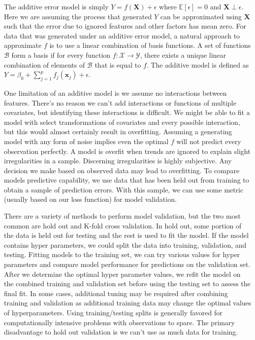 \documentclass[
  12pt,
  letterpaper,
  DIV=11,
  numbers=noendperiod]{scrartcl}
\newcommand{\bm}{\mathbf}
\begin{document}
The additive error model is simply \(Y=f(\bm X)+\epsilon\) where
\(\mathbb{E}[\epsilon]=0\) and \(\bm X\perp\epsilon\). Here we are
assuming the process that generated \(Y\) can be approximated using
\(\bm X\) such that the error due to ignored features and other factors
has mean zero. For data that was generated under an additive error
model, a natural approach to approximate \(f\) is to use a linear
combination of basis functions. A set of functions \(\mathcal{B}\) form
a basis if for every function \(f:\mathcal{X}\rightarrow\mathcal{Y}\),
there exists a unique linear combination of elements of \(\mathcal{B}\)
that is equal to \(f\). The additive model is defined as
\(Y=\beta_0+\sum_{j=1}^pf_j(\bm x_j)+\epsilon\).

One limitation of an additive model is we assume no interactions between
features. There's no reason we can't add interactions or functions of
multiple covariates, but identifying these interactions is difficult. We
might be able to fit a model with select transformations of covariates
and every possible interaction, but this would almost certainly result
in overfitting. Assuming a generating model with any form of noise
implies even the optimal \(f\) will not predict every observation
perfectly. A model is overfit when trends are ignored to explain slight
irregularities in a sample. Discerning irregularities is highly
subjective. Any decision we make based on observed data may lead to
overfitting. To compare models predictive capability, we use data that
has been held out from training to obtain a sample of prediction errors.
With this sample, we can use some metric (usually based on our loss
function) for model validation.

There are a variety of methods to perform model validation, but the two
most common are hold out and K-fold cross validation. In hold out, some
portion of the data is held out for testing and the rest is used to fit
the model. If the model contains hyper parameters, we could split the
data into training, validation, and testing. Fitting models to the
training set, we can try various values for hyper parameters and compare
model performance for predictions on the validation set. After we
determine the optimal hyper parameter values, we refit the model on the
combined training and validation set before using the testing set to
assess the final fit. In some cases, additional tuning may be required
after combining training and validation as additional training data may
change the optimal values of hyperparameters. Using training/testing
splits is generally favored for computationally intensive problems with
observations to spare. The primary disadvantage to hold out validation
is we can't use as much data for training.
\end{document}
